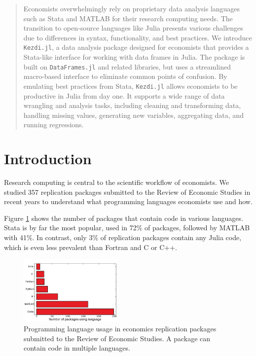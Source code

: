 \documentclass{juliacon}
\begin{document}

\maketitle

\begin{abstract}
Economists overwhelmingly rely on proprietary data analysis languages such as Stata and MATLAB for their research computing needs. The transition to open-source languages like Julia presents various challenges due to differences in syntax, functionality, and best practices. We introduce \texttt{Kezdi.jl}, a data analysis package designed for economists that provides a Stata-like interface for working with data frames in Julia. The package is built on \texttt{DataFrames.jl} and related libraries, but uses a streamlined macro-based interface to eliminate common points of confusion. By emulating best practices from Stata, \texttt{Kezdi.jl} allows economists to be productive in Julia from day one. It supports a wide range of data wrangling and analysis tasks, including cleaning and transforming data, handling missing values, generating new variables, aggregating data, and running regressions.
\end{abstract}

\section{Introduction}

Research computing is central to the scientific workflow of economists. We studied 357 replication packages submitted to the Review of Economic Studies in recent years to understand what programming languages economists use and how.

Figure \ref{fig:languages} shows the number of packages that contain code in various languages. Stata is by far the most popular, used in 72\% of packages, followed by MATLAB with 41\%. In contrast, only 3\% of replication packages contain any Julia code, which is even less prevalent than Fortran and C or C++.

\begin{figure}[h]
\centering
\includegraphics[width=0.45\textwidth]{languages.png}
\caption{Programming language usage in economics replication packages submitted to the Review of Economic Studies. A package can contain code in multiple languages.}
\label{fig:languages}
\end{figure}
\end{document}
